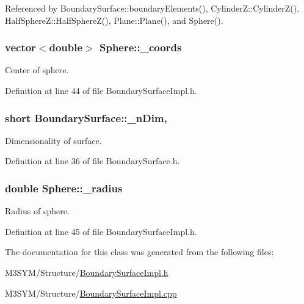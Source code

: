 Referenced by Boundary\+Surface\+::boundary\+Elements(), Cylinder\+Z\+::\+Cylinder\+Z(), Half\+Sphere\+Z\+::\+Half\+Sphere\+Z(), Plane\+::\+Plane(), and Sphere().

\hypertarget{classSphere_a68255c3822c940da2e423d17aaaf6190}{
\subsubsection[{\+\_\+coords}]{\setlength{\rightskip}{0pt plus 5cm}vector$<$double$>$ Sphere\+::\+\_\+coords\hspace{0.3cm}{\ttfamily [private]}}}\label{classSphere_a68255c3822c940da2e423d17aaaf6190}


Center of sphere. 



Definition at line 44 of file Boundary\+Surface\+Impl.\+h.

\hypertarget{classBoundarySurface_af3ed79310c6ba6cdc8e9f176bf463eb1}{
\subsubsection[{\+\_\+n\+Dim}]{\setlength{\rightskip}{0pt plus 5cm}short Boundary\+Surface\+::\+\_\+n\+Dim\hspace{0.3cm}{\ttfamily [protected]}, {\ttfamily [inherited]}}}\label{classBoundarySurface_af3ed79310c6ba6cdc8e9f176bf463eb1}


Dimensionality of surface. 



Definition at line 36 of file Boundary\+Surface.\+h.

\hypertarget{classSphere_a3e97d05676e0513fa6b01b419b071bc6}{
\subsubsection[{\+\_\+radius}]{\setlength{\rightskip}{0pt plus 5cm}double Sphere\+::\+\_\+radius\hspace{0.3cm}{\ttfamily [private]}}}\label{classSphere_a3e97d05676e0513fa6b01b419b071bc6}


Radius of sphere. 



Definition at line 45 of file Boundary\+Surface\+Impl.\+h.



The documentation for this class was generated from the following files\+:\begin{DoxyCompactItemize}
\item 
M3\+S\+Y\+M/\+Structure/\hyperlink{BoundarySurfaceImpl_8h}{Boundary\+Surface\+Impl.\+h}\item 
M3\+S\+Y\+M/\+Structure/\hyperlink{BoundarySurfaceImpl_8cpp}{Boundary\+Surface\+Impl.\+cpp}\end{DoxyCompactItemize}
